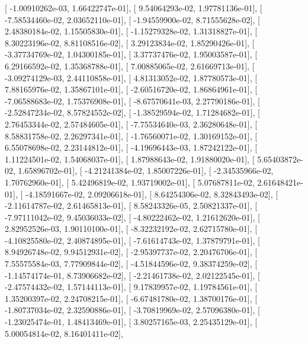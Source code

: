 \documentclass{article}
\begin{document}
       [ -1.00910262e-03,   1.66422747e-01],
       [  9.54064293e-02,   1.97781136e-01],
       [ -7.58534460e-02,   2.03652110e-01],
       [ -1.94559900e-02,   8.71555628e-02],
       [  2.48380184e-02,   1.15505830e-01],
       [ -1.15279328e-02,   1.31318827e-01],
       [  8.30223196e-02,   8.81108516e-02],
       [  3.29123834e-02,   1.85290426e-01],
       [ -3.37734769e-02,   1.04300185e-01],
       [  3.37737476e-02,   1.95003587e-01],
       [  6.29166592e-02,   1.35368788e-01],
       [  7.00885065e-02,   2.61669713e-01],
       [ -3.09274129e-03,   2.44110858e-01],
       [  4.81313052e-02,   1.87780573e-01],
       [  7.88165976e-02,   1.35867101e-01],
       [ -2.60516720e-02,   1.86864961e-01],
       [ -7.06588683e-02,   1.75376908e-01],
       [ -8.67570641e-03,   2.27790186e-01],
       [ -2.52847234e-02,   8.57824552e-02],
       [ -1.38529594e-02,   1.71284682e-01],
       [  2.76453344e-02,   2.57484605e-01],
       [ -7.75534640e-03,   2.36280648e-01],
       [  8.58831758e-02,   2.26297341e-01],
       [ -1.76560071e-02,   1.30169152e-01],
       [  6.55078698e-02,   2.23144812e-01],
       [ -4.19696443e-03,   1.87242122e-01],
       [  1.11224501e-02,   1.54068037e-01],
       [  1.87988643e-02,   1.91880020e-01],
       [  5.65403872e-02,   1.65896702e-01],
       [ -4.21241384e-02,   1.85007226e-01],
       [ -2.34535966e-02,   1.70762960e-01],
       [  5.42496819e-02,   1.93719002e-01],
       [  5.07687811e-02,   2.61648421e-01],
       [ -4.18591667e-02,   2.09206618e-01],
       [  8.64254306e-02,   8.32843493e-02],
       [ -2.11614787e-02,   2.61465813e-01],
       [  8.58243326e-05,   2.50821337e-01],
       [ -7.97111042e-02,   9.45036033e-02],
       [ -4.80222462e-02,   1.21612620e-01],
       [  2.82952526e-03,   1.90110100e-01],
       [ -8.32232192e-02,   2.62715780e-01],
       [ -4.10825580e-02,   2.40874895e-01],
       [ -7.61614743e-02,   1.37879791e-01],
       [  8.94926748e-02,   9.94512931e-02],
       [ -2.95397737e-02,   2.20476706e-01],
       [  7.55575584e-03,   7.77909844e-02],
       [ -4.51844596e-02,   9.38374259e-02],
       [ -1.14574174e-01,   8.73906682e-02],
       [ -2.21461738e-02,   2.02122545e-01],
       [ -2.47574432e-02,   1.57144113e-01],
       [  9.17839957e-02,   1.19784561e-01],
       [  1.35200397e-02,   2.24708215e-01],
       [ -6.67481780e-02,   1.38700176e-01],
       [ -1.80737034e-02,   2.32590886e-01],
       [ -3.70819969e-02,   2.57096380e-01],
       [ -1.23025474e-01,   1.48413469e-01],
       [  3.80257165e-03,   2.25435129e-01],
       [  5.00054814e-02,   8.16401411e-02],
\end{document}
